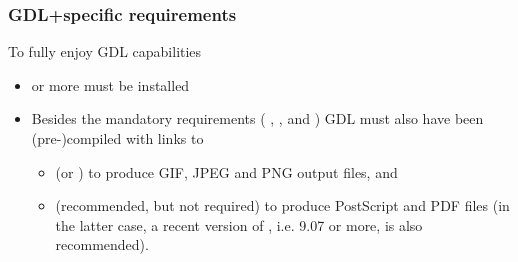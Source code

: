 \documentclass[12pt,twoside]{article}
\begin{document}
\subsubsection*{GDL+\healpix specific requirements}
To fully enjoy GDL capabilities
\begin{itemize}
\item \healpix \hpxversion{} or more must be installed%

\item
Besides the mandatory requirements (%
, 
, 
and 
) 
GDL must also have been (pre-)compiled with links to
\begin{itemize}
\item {}
(or ) 
to produce GIF, JPEG and PNG output files, and
\item {} (recommended, but not required) 
to produce PostScript and PDF files (in the latter case,
a recent version of , i.e. 9.07 or more, is also recommended).
\end{itemize}


\end{itemize}
\end{document}

